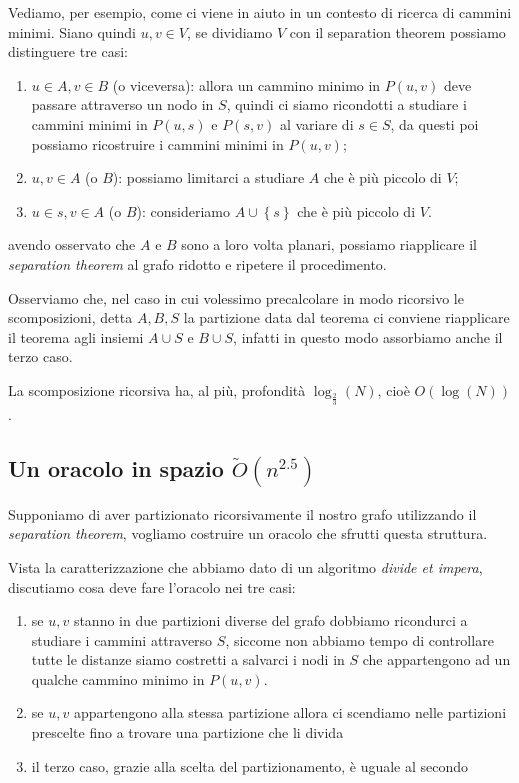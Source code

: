 \documentclass[a4paper,10pt]{amsbook}
\theoremstyle{plain}
\theoremstyle{definition}
\theoremstyle{remark}
\newcommand{\set}[1]{\left\{#1\right\}}
\newcommand{\pa}[1]{\left(#1\right)}
\begin{document}
Vediamo, per esempio, come ci viene in aiuto in un contesto di ricerca
di cammini minimi. Siano quindi $u,v \in V$, se dividiamo $V$ con il
separation theorem possiamo distinguere tre casi: 
\begin{enumerate}
\item $u \in A, v\in B$ (o viceversa): allora un cammino minimo in
  $P(u,v)$ deve passare attraverso un nodo in $S$, quindi ci siamo
  ricondotti a studiare i cammini minimi in $P(u,s)$ e $P(s,v)$ al
  variare di $s \in S$, da questi poi possiamo ricostruire i cammini
  minimi in $P(u,v)$;
\item $u,v \in A$ (o $B$): possiamo limitarci a studiare $A$ che \`e
  più piccolo di $V$;
\item $u\in s, v\in A$ (o $B$): consideriamo $A\cup \set{s}$ che \`e
  pi\`u piccolo di $V$.
\end{enumerate}
avendo osservato che $A$ e $B$ sono a loro volta planari, possiamo
riapplicare il \textit{separation theorem} al grafo ridotto e ripetere
il procedimento.

Osserviamo che, nel caso in cui volessimo precalcolare in modo
ricorsivo le scomposizioni, detta $A,B,S$ la partizione data dal
teorema ci conviene riapplicare il teorema agli insiemi $A\cup S$ e
$B\cup S$, infatti in questo modo assorbiamo anche il terzo caso.

La scomposizione ricorsiva ha, al pi\`u, profondit\`a $\log
_{\frac{2}{3}} \pa{N}$, cio\`e $O\pa{ \log\pa{N}}$.

\subsection{Un oracolo in spazio $\tilde O(n^{2.5})$}

Supponiamo di aver partizionato ricorsivamente il nostro grafo
utilizzando il \textit{separation theorem}, vogliamo costruire un
oracolo che sfrutti questa struttura.

Vista la caratterizzazione che abbiamo dato di un algoritmo
\textit{divide et impera}, discutiamo cosa deve fare l'oracolo nei tre
casi:
\begin{enumerate}
\item se $u,v$ stanno in due partizioni diverse del grafo dobbiamo
  ricondurci a studiare i cammini attraverso $S$, siccome non abbiamo
  tempo di controllare tutte le distanze siamo costretti a salvarci i
  nodi in $S$ che appartengono ad un qualche cammino minimo in
  $P(u,v)$.
\item se $u,v$ appartengono alla stessa partizione allora ci
  scendiamo nelle partizioni prescelte fino a trovare una partizione
  che li divida
\item il terzo caso, grazie alla scelta del partizionamento, \`e
  uguale al secondo
\end{enumerate}
\end{document}
